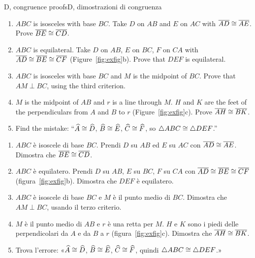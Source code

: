 \begin{exercise}{D, congruence proofs}{D, dimostrazioni di congruenza}
\begin{enumerate}[label=\textbf{D\arabic*.}, leftmargin=2.2em]
\item $ABC$ is isosceles with base $BC$. Take $D$ on $AB$ and $E$ on $AC$ with $\overline{AD} \cong \overline{AE}$. Prove $\overline{BE} \cong \overline{CD}$.
\item $ABC$ is equilateral. Take $D$ on $AB$, $E$ on $BC$, $F$ on $CA$ with $\overline{AD} \cong \overline{BE} \cong \overline{CF}$ (Figure~\ref{fig:exfig}b). Prove that $DEF$ is equilateral.
\item $ABC$ is isosceles with base $BC$ and $M$ is the midpoint of $BC$. Prove that $AM \perp BC$, using the third criterion.
\item $M$ is the midpoint of $AB$ and $r$ is a line through $M$. $H$ and $K$ are the feet of the perpendiculars from $A$ and $B$ to $r$ (Figure~\ref{fig:exfig}c). Prove $\overline{AH} \cong \overline{BK}$.
\item Find the mistake: ``$\widehat{A} \cong \widehat{D}$, $\widehat{B} \cong \widehat{E}$, $\widehat{C} \cong \widehat{F}$, so $\triangle ABC \cong \triangle DEF$.''
\end{enumerate}
\tcblower
\begin{enumerate}[label=\textbf{D\arabic*.}, leftmargin=2.2em]
\item $ABC$ è isoscele di base $BC$. Prendi $D$ su $AB$ ed $E$ su $AC$ con $\overline{AD} \cong \overline{AE}$. Dimostra che $\overline{BE} \cong \overline{CD}$.
\item $ABC$ è equilatero. Prendi $D$ su $AB$, $E$ su $BC$, $F$ su $CA$ con $\overline{AD} \cong \overline{BE} \cong \overline{CF}$ (figura~\ref{fig:exfig}b). Dimostra che $DEF$ è equilatero.
\item $ABC$ è isoscele di base $BC$ e $M$ è il punto medio di $BC$. Dimostra che $AM \perp BC$, usando il terzo criterio.
\item $M$ è il punto medio di $AB$ e $r$ è una retta per $M$. $H$ e $K$ sono i piedi delle perpendicolari da $A$ e da $B$ a $r$ (figura~\ref{fig:exfig}c). Dimostra che $\overline{AH} \cong \overline{BK}$.
\item Trova l'errore: «$\widehat{A} \cong \widehat{D}$, $\widehat{B} \cong \widehat{E}$, $\widehat{C} \cong \widehat{F}$, quindi $\triangle ABC \cong \triangle DEF$.»
\end{enumerate}
\end{exercise}

